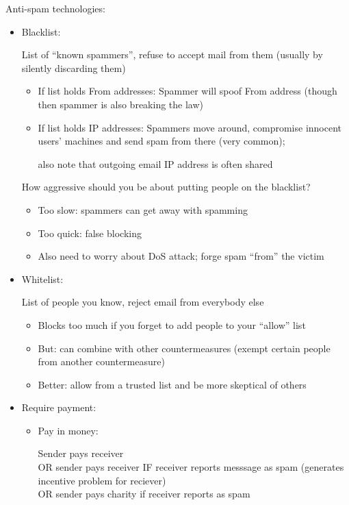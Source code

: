 Anti-spam technologies:
\begin{itemize}
    \item Blacklist:

        List of ``known spammers'', refuse to accept mail from them (usually by silently discarding them)
        \begin{itemize}
            \item If list holds From addresses: Spammer will spoof From address (though then spammer is also breaking the law)
            \item If list holds IP addresses: Spammers move around, compromise innocent users' machines and send spam from there (very common);
                
                also note that outgoing email IP address is often shared
        \end{itemize}
        How aggressive should you be about putting people on the blacklist?
        \begin{itemize}
            \item Too slow: spammers can get away with spamming
            \item Too quick: false blocking
            \item Also need to worry about DoS attack; forge spam ``from'' the victim
        \end{itemize}
    \item Whitelist:

        List of people you know, reject email from everybody else
        \begin{itemize}
            \item Blocks too much if you forget to add people to your ``allow'' list
            \item But: can combine with other countermeasures (exempt certain people from another countermeasure)
            \item Better: allow from a trusted list and be more skeptical of others
        \end{itemize}
    \item Require payment:
        \begin{itemize}
            \item Pay in money:

                Sender pays receiver\\
                OR sender pays receiver IF receiver reports messsage as spam
                (generates incentive problem for reciever)\\
                OR sender pays charity if receiver reports as spam


\end{itemize}
\end{itemize}
